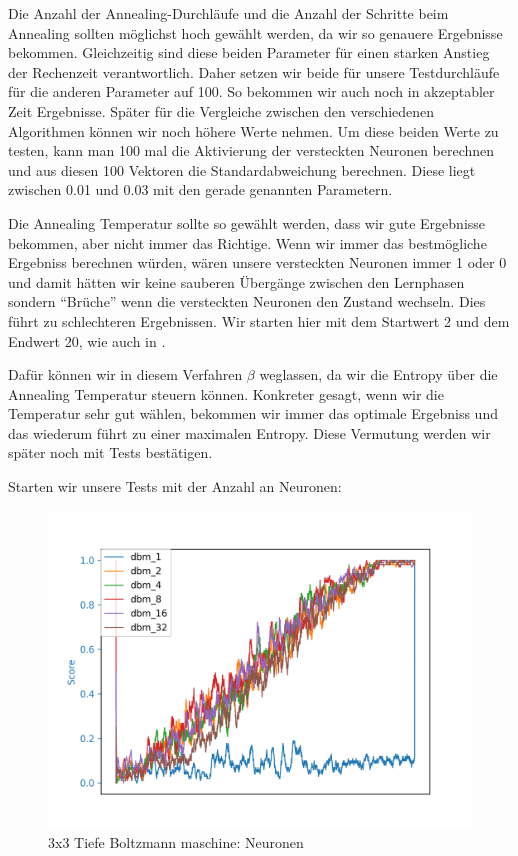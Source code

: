 Die Anzahl der Annealing-Durchläufe und die Anzahl der Schritte beim Annealing sollten möglichst hoch gewählt werden, da wir so genauere Ergebnisse bekommen. Gleichzeitig sind diese beiden Parameter für einen starken Anstieg der Rechenzeit verantwortlich. Daher setzen wir beide für unsere Testdurchläufe für die anderen Parameter auf 100. So bekommen wir auch noch in akzeptabler Zeit Ergebnisse. Später für die Vergleiche zwischen den verschiedenen Algorithmen können wir noch höhere Werte nehmen. Um diese beiden Werte zu testen, kann man 100 mal die Aktivierung der versteckten Neuronen berechnen und aus diesen 100 Vektoren die Standardabweichung berechnen. Diese liegt zwischen 0.01 und 0.03 mit den gerade genannten Parametern.

Die Annealing Temperatur sollte so gewählt werden, dass wir gute Ergebnisse bekommen, aber nicht immer das Richtige. Wenn wir immer das bestmögliche Ergebniss berechnen würden,  wären unsere versteckten Neuronen immer 1 oder 0 und damit hätten wir keine sauberen Übergänge zwischen den Lernphasen sondern ``Brüche'' wenn die versteckten Neuronen den Zustand wechseln. Dies führt zu schlechteren Ergebnissen. Wir starten hier mit dem Startwert 2 und dem Endwert 20, wie auch in \citep{crawford2019reinforcement}.

Dafür können wir in diesem Verfahren $\beta$ weglassen, da wir die Entropy über die Annealing Temperatur steuern können. Konkreter gesagt, wenn wir die Temperatur sehr gut wählen, bekommen wir immer das optimale Ergebniss und das wiederum führt zu einer maximalen Entropy. Diese Vermutung werden wir später noch mit Tests bestätigen.

Starten wir unsere Tests mit der Anzahl an Neuronen:

\begin{figure}[H]
\centering
\includegraphics[width=\textwidth]{Figures/dbm1_3x3_dbm_1_dbm_2_dbm_4_dbm_8_dbm_16_dbm_32.png}
\caption{3x3 Tiefe Boltzmann maschine: Neuronen}
\label{dbm1}
\end{figure}

